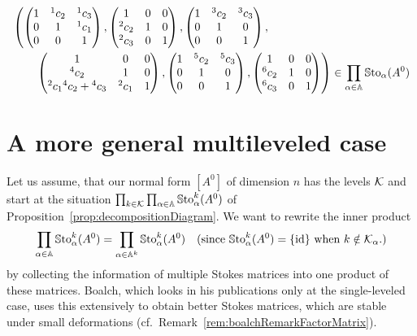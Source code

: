 \begin{align*}
  &\left(
    \begin{pmatrix} 1 & {}^1c_2 & {}^1c_3 \\0 & 1 & {}^1c_1 \\0 & 0 & 1 \end{pmatrix},
    \begin{pmatrix} 1 & 0 & 0 \\{}^2c_2 & 1 & 0 \\{}^2c_3 & 0 & 1 \end{pmatrix},
    \begin{pmatrix} 1 & {}^3c_2 & {}^3c_3 \\0 & 1 & 0 \\0 & 0 & 1 \end{pmatrix},
  \right.
\\&\qquad
  \left.
    \begin{pmatrix} 1 & 0 & 0 \\{}^4c_2 & 1 & 0 \\{}^2c_1{}^4c_2+{}^4c_3 & {}^2c_1 & 1 \end{pmatrix},
    \begin{pmatrix} 1 & {}^5c_2 & {}^5c_3 \\0 & 1 & 0 \\0 & 0 & 1 \end{pmatrix},
    \begin{pmatrix} 1 & 0 & 0 \\{}^{6}c_2 & 1 & 0 \\{}^{6}c_3 & 0 & 1 \end{pmatrix}
  \right)
  \in
  \prod_{\alpha\in\mathbb{A}}\operatorname{\mathbb{S}to}_{\alpha}(A^0)
\end{align*}

\section{A more general multileveled case}
Let us assume, that our normal form $[A^0]$ of dimension $n$ has the levels
$\mathcal{K}$ and start at the situation
$\prod_{k\in\mathcal{K}}\prod_{\alpha\in\mathbb{A}}\operatorname{\mathbb{S}to}_{\alpha}^{k}(A^0)$
of Proposition~\ref{prop:decompositionDiagram}.
We want to rewrite the inner product
\begin{align*}
  \prod_{\alpha\in\mathbb{A}}\operatorname{\mathbb{S}to}_{\alpha}^{k}(A^0)
  &=\prod_{\alpha\in\mathbb{A}^k}\operatorname{\mathbb{S}to}_{\alpha}^{k}(A^0)
  &\text{(since $\operatorname{\mathbb{S}to}_{\alpha}^{k}(A^0)=\{\operatorname{id}\}$ when $k\notin\mathcal{K}_\alpha$.)}
\end{align*}
by collecting the information of multiple Stokes matrices into one product of
these matrices.
Boalch, which looks in his publications \cite{boalch,thboalch} only at the
single-leveled case, uses this extensively to obtain better Stokes matrices,
which are stable under small deformations
(cf.\ Remark~\ref{rem:boalchRemarkFactorMatrix}).

